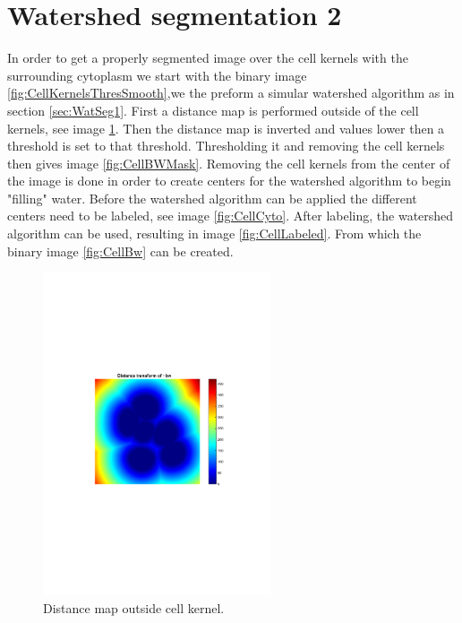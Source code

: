 \documentclass[10pt,twocolumn]{article}
\begin{document}
\section{Watershed segmentation 2}
In order to get a properly segmented image over the cell kernels with the
surrounding cytoplasm we start with the binary image \ref{fig:CellKernelsThresSmooth},we the preform a
simular watershed algorithm as in section \ref{sec:WatSeg1}. First a distance
map is performed outside of the cell kernels, see image \ref{fig:CellDist}. Then the distance map is
inverted and values lower then a threshold is set to that threshold.
Thresholding it and removing the cell kernels then gives image \ref{fig:CellBWMask}.
Removing the cell kernels from the center of the image is done in order to create centers for the
watershed algorithm to begin "filling" water. Before the watershed algorithm can
be applied the different centers need to be labeled, see image \ref{fig:CellCyto}.
After labeling, the watershed algorithm can be used, resulting in image \ref{fig:CellLabeled}.
From which the binary image \ref{fig:CellBw} can be created.

\begin{figure}[ht]
\centering
\includegraphics[width=0.6\textwidth]{Bilder/CellDist.pdf}
\caption{Distance map outside cell kernel.}
\label{fig:CellDist}
\end{figure}
\end{document}
